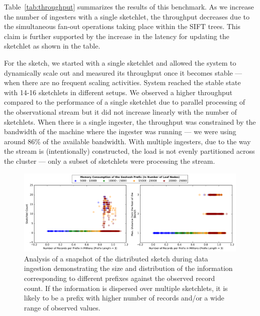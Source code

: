 Table~\ref{tab:throughput} summarizes the results of this benchmark.
As we increase the number of ingesters with a single sketchlet, the throughput decreases due to the simultaneous fan-out operations taking place within the SIFT trees. This claim is further supported by the increase in the latency for updating the sketchlet as shown in the table.

For the sketch, we started with a single sketchlet and allowed the system to dynamically scale out and measured its throughput once it becomes stable --- when there are no frequent scaling activities.
System reached the stable state with 14-16 sketchlets in different setups.
We observed a higher throughput compared to the performance of a single sketchlet due to parallel processing of the observational stream but it did not increase linearly with the number of sketchlets.
When there is a single ingester, the throughput was constrained by the bandwidth of the machine where the ingester was running --- we were using around 86\% of the available bandwidth.
With multiple ingesters, due to the way the stream is (intentionally) constructed, the load is not evenly partitioned across the cluster --- only a subset of sketchlets were processing the stream.
%
\begin{figure}
    \centerline{\includegraphics[width=\linewidth]{figures/scaleout_graph_analysis.pdf}}
    \caption{Analysis of a snapshot of the distributed sketch during data ingestion demonstrating the size and distribution of the information corresponding to different prefixes against the observed record count. If the information is dispersed over multiple sketchlets, it is likely to be a prefix with higher number of records and/or a wide range of observed values.}
    \label{fig:scaleout-graph-analysis}
\end{figure}
%

